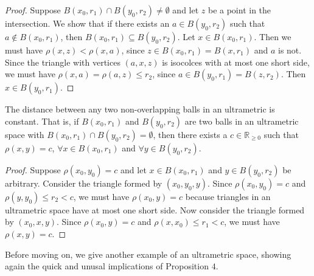 \begin{proof}
Suppose $B(x_0, r_1) \cap B(y_0, r_2) \neq \emptyset$ and let $z$ be a point in the intersection. We show that if there exists an $a \in B(y_0, r_2)$ such that $a \notin B(x_0,r_1)$, then $B(x_0, r_1) \subseteq B(y_0, r_2)$. Let $x \in B(x_0, r_1)$. Then we must have $\rho(x,z) < \rho(x,a)$, since $z \in B(x_0, r_1) = B(x,r_1)$ and $a$ is not. Since the triangle with vertices $(a,x,z)$ is isocolces with at most one short side, we must have $\rho(x,a) = \rho(a,z) \leq r_2$, since $a \in B(y_0, r_1) = B(z,r_2)$. Then $x \in B(y_0, r_1)$. 
\end{proof}

\begin{proposition}
 The distance between any two non-overlapping balls in an ultrametric is constant. That is, if $B(x_0, r_1)$ and $B(y_0, r_2)$ are two balls in an ultrametric space with $B(x_0, r_1) \cap B(y_0, r_2) = \emptyset$, then there exists a $c \in \mathbb{R}_{\geq 0}$ such that  $\rho(x,y)=c$, $\forall x \in B(x_0, r_1)$ and $\forall y \in B(y_0, r_2)$.
\end{proposition}

\begin{proof}
Suppose $\rho(x_0, y_0)=c$ and let $x \in B(x_0, r_1)$ and $y \in B(y_0, r_2)$ be arbitrary. Consider the triangle formed by $(x_0, y_0,y)$. Since $\rho(x_0,y_0)=c$ and  $\rho(y,y_0) \leq r_2 < c$, we must have $\rho(x_0, y)=c$ because triangles in an ultrametric space have at most one short side. Now consider the triangle formed by  $(x_0, x,y)$. Since $\rho(x_0, y)=c$ and  $\rho(x,x_0) \leq r_1 < c$, we must have $\rho(x, y)=c$.
\end{proof}


Before moving on, we give another example of an ultrametric space, showing again the quick and unusal implications of Proposition $4$.\\

